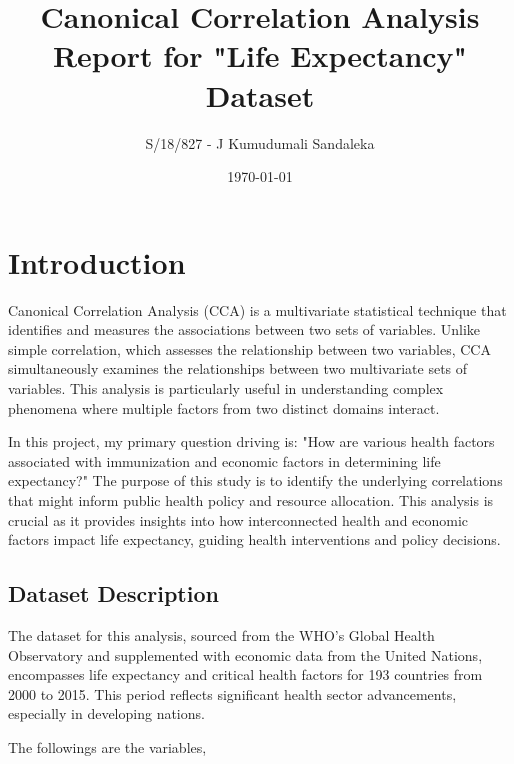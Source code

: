 \documentclass[11pt]{article}
\title{Canonical Correlation Analysis Report for "Life Expectancy" Dataset}
\author{S/18/827 - J Kumudumali Sandaleka}
\date{\today}
\begin{document}
	
	\maketitle
	\setlength{\parindent}{0pt}
	\setlength{\parskip}{6pt}
	
	\section{Introduction}
	Canonical Correlation Analysis (CCA) is a multivariate statistical technique that identifies and measures the associations between two sets of variables. Unlike simple correlation, which assesses the relationship between two variables, CCA simultaneously examines the relationships between two multivariate sets of variables. This analysis is particularly useful in understanding complex phenomena where multiple factors from two distinct domains interact.
	
	In this project, my primary question driving is: "How are various health factors associated with immunization and economic factors in determining life expectancy?" The purpose of this study is to identify the underlying correlations that might inform public health policy and resource allocation. This analysis is crucial as it provides insights into how interconnected health and economic factors impact life expectancy, guiding health interventions and policy decisions.
	
		\subsection{Dataset Description}
		The dataset for this analysis, sourced from the WHO's Global Health Observatory and supplemented with economic data from the United Nations, encompasses life expectancy and critical health factors for 193 countries from 2000 to 2015. This period reflects significant health sector advancements, especially in developing nations.
		
		The followings are the variables,
		
\end{document}
